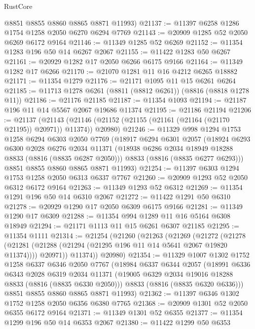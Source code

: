 \begin{lexlean}{RustCore}
\begin{coremodule}
      @8851
      @8855
      @8860
      @8865
      @8871
      @11993)
@21137 := @11397 @6258 @1286 @1754 @1258 @2050 @6270 @6294 @7769
@21143 := @20909 @1285 @52 @2050 @6269 @6172 @9164
@21146 := @11349 @1285 @52 @6269
@21152 := @11354 @1283 @196 @50 @14 @6267 @2067
@21155 := @11422 @1283 @50 @6267
@21161 := @20929 @1282 @17 @2050 @6266 @6175 @9166
@21164 := @11349 @1282 @17 @6266
@21170 := @21070 @1281 @11 @16 @4212 @6265 @18882
@21171 := @11354 @1279
@21176 := @21171 @1095 @11 @15 @6261 @6264
@21185 := @11713 @1278 @6261 (@8811 (@8812 @6261)) (@8816 (@8818 @1278 @11))
@21186 := @21176 @21185
@21187 := @11354 @1093
@21194 := @21187 @196 @11 @14 @5567 @2067 @19686 @11374
@21195 := @21186 @21194
@21206 := @21137
    (@21143 (@21146 (@21152 (@21155 (@21161 (@21164 (@21170 @21195)) @20971)) @11374)) @20980)
@21246 := @11329
    @998
    @1294
    @1753
    @1258
    @6294
    @6303
    @2050
    @7769
    (@18917
      @6294
      @6301
      @2057
      (@18924
        @6293
        @6300
        @2028
        @6276
        @2034
        @11371
        (@18938 @6286 @2034 @18949 @18288 @8833 (@8816 (@8835 @6287 @2050)))
        @8833
        (@8816 (@8835 @6277 @6293)))
      @8851
      @8855
      @8860
      @8865
      @8871
      @11993)
@21254 := @11397 @6303 @1294 @1753 @1258 @2050 @6313 @6337 @7767
@21260 := @20909 @1293 @52 @2050 @6312 @6172 @9164
@21263 := @11349 @1293 @52 @6312
@21269 := @11354 @1291 @196 @50 @14 @6310 @2067
@21272 := @11422 @1291 @50 @6310
@21278 := @20929 @1290 @17 @2050 @6309 @6175 @9166
@21281 := @11349 @1290 @17 @6309
@21288 := @11354 @994 @1289 @11 @16 @5164 @6308 @18949
@21294 := @21171 @1113 @11 @15 @6261 @6307 @21185
@21295 := @11354 @1111
@21314 := @21254
    (@21260
      (@21263
        (@21269
          (@21272
            (@21278
              (@21281 (@21288 (@21294 (@21295 @196 @11 @14 @5641 @2067 @19820 @11374))))
              @20971))
          @11374))
      @20980)
@21354 := @11329
    @1007
    @1302
    @1752
    @1258
    @6337
    @6346
    @2050
    @7767
    (@18984
      @6337
      @6344
      @2057
      (@18991
        @6336
        @6343
        @2028
        @6319
        @2034
        @11371
        (@19005 @6329 @2034 @19016 @18288 @8833 (@8816 (@8835 @6330 @2050)))
        @8833
        (@8816 (@8835 @6320 @6336)))
      @8851
      @8855
      @8860
      @8865
      @8871
      @11993)
@21362 := @11397 @6346 @1302 @1752 @1258 @2050 @6356 @6380 @7765
@21368 := @20909 @1301 @52 @2050 @6355 @6172 @9164
@21371 := @11349 @1301 @52 @6355
@21377 := @11354 @1299 @196 @50 @14 @6353 @2067
@21380 := @11422 @1299 @50 @6353

\end{coremodule}
\end{lexlean}
